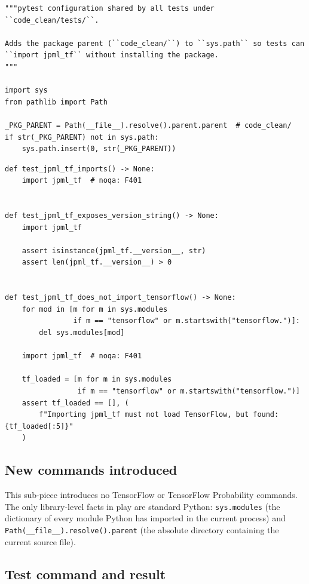 \documentclass[11pt]{report}
\begin{document}
\begin{lstlisting}[style=python, caption={\texttt{code\_clean/tests/conftest.py}}]
"""pytest configuration shared by all tests under ``code_clean/tests/``.

Adds the package parent (``code_clean/``) to ``sys.path`` so tests can
``import jpml_tf`` without installing the package.
"""

import sys
from pathlib import Path

_PKG_PARENT = Path(__file__).resolve().parent.parent  # code_clean/
if str(_PKG_PARENT) not in sys.path:
    sys.path.insert(0, str(_PKG_PARENT))
\end{lstlisting}

\begin{lstlisting}[style=python, caption={\texttt{code\_clean/tests/test\_01\_imports.py} (excerpt)}]
def test_jpml_tf_imports() -> None:
    import jpml_tf  # noqa: F401


def test_jpml_tf_exposes_version_string() -> None:
    import jpml_tf

    assert isinstance(jpml_tf.__version__, str)
    assert len(jpml_tf.__version__) > 0


def test_jpml_tf_does_not_import_tensorflow() -> None:
    for mod in [m for m in sys.modules
                if m == "tensorflow" or m.startswith("tensorflow.")]:
        del sys.modules[mod]

    import jpml_tf  # noqa: F401

    tf_loaded = [m for m in sys.modules
                 if m == "tensorflow" or m.startswith("tensorflow.")]
    assert tf_loaded == [], (
        f"Importing jpml_tf must not load TensorFlow, but found: {tf_loaded[:5]}"
    )
\end{lstlisting}

\subsection*{New commands introduced}

This sub-piece introduces no TensorFlow or TensorFlow Probability
commands. The only library-level facts in play are standard Python:
\texttt{sys.modules} (the dictionary of every module Python has
imported in the current process) and \texttt{Path(\_\_file\_\_).resolve().parent}
(the absolute directory containing the current source file).

\subsection*{Test command and result}
\end{document}
